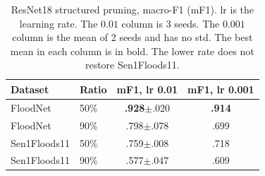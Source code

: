 \documentclass[conference]{IEEEtran}
\begin{document}
\begin{table}[t]
\centering
\caption{ResNet18 structured pruning, macro-F1 (mF1). lr is the
learning rate. The $0.01$ column is 3 seeds. The $0.001$ column is the
mean of 2 seeds and has no std. The best mean in each column is in
bold. The lower rate does not restore Sen1Floods11.}
\label{tab:lrcontrol}
\footnotesize
\begin{tabular}{llcc}
\toprule
\textbf{Dataset} & \textbf{Ratio} & \textbf{mF1, lr 0.01} &
\textbf{mF1, lr 0.001}\\
\midrule
FloodNet     & 50\% & \textbf{.928}$\pm$.020 & \textbf{.914}\\
FloodNet     & 90\% & .798$\pm$.078 & .699\\
Sen1Floods11 & 50\% & .759$\pm$.008 & .718\\
Sen1Floods11 & 90\% & .577$\pm$.047 & .609\\
\bottomrule
\end{tabular}
\end{table}
\end{document}
